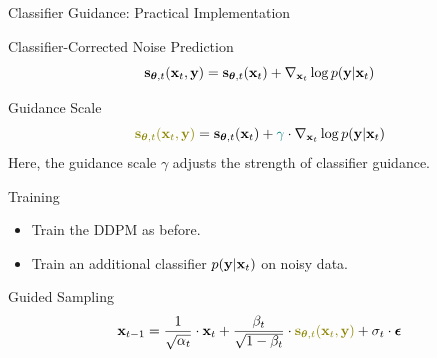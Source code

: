 \documentclass{beamer}
\begin{document}
\begin{frame}{Classifier Guidance: Practical Implementation}
	\begin{block}{Classifier-Corrected Noise Prediction}
		\vspace{-0.3cm}
		\[
			\mathbf{s}_{\boldsymbol{\theta}, t}(\mathbf{x}_t, \mathbf{y}) = \mathbf{s}_{\boldsymbol{\theta}, t}(\mathbf{x}_t) + \nabla_{\mathbf{x}_t} \log p(\mathbf{y} | \mathbf{x}_t)
		\]
		\vspace{-0.5cm}
	\end{block}
	\eqpause
	\begin{block}{Guidance Scale}
		\vspace{-0.3cm}
		\[
			{\color{olive}\bs_{\btheta, t}(\bx_t, \by)} = \bs_{\btheta, t}(\bx_t) + {\color{teal}\gamma} \cdot \nabla_{\bx_t} \log p(\by | \bx_t)
		\]
		Here, the {\color{teal}guidance scale $\gamma$} adjusts the strength of classifier guidance.
	\end{block}
	\eqpause
	\begin{block}{Training}
		\begin{itemize}
			\item Train the DDPM as before.
			\item Train an additional classifier $p(\mathbf{y} | \mathbf{x}_t)$ on noisy data.
		\end{itemize}
		\vspace{-0.2cm}
	\end{block}
	\eqpause
	\begin{block}{Guided Sampling}
		\vspace{-0.3cm}
		\[
			\bx_{t-1} = \frac{1}{\sqrt{\alpha_t}} \cdot \bx_t + \frac{\beta_t}{\sqrt{1 - \beta_t}} \cdot  {\color{olive}\bs_{\btheta, t}(\bx_t, \by)} + \sigma_t \cdot \bepsilon
		\]
	\end{block}
\end{frame}
\end{document}
